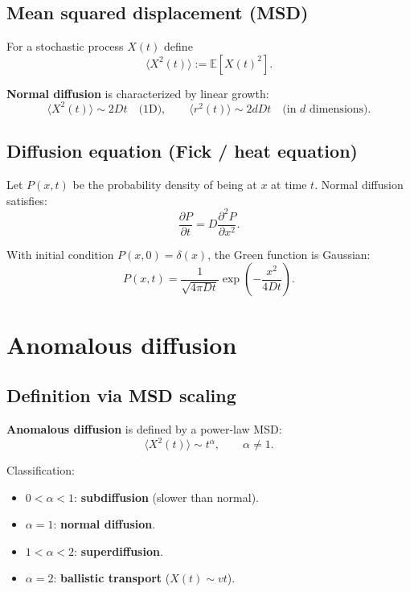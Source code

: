 \subsection{Mean squared displacement (MSD)}
For a stochastic process $X(t)$ define
\begin{equation}
\langle X^2(t)\rangle := \mathbb{E}[X(t)^2].
\end{equation}

\textbf{Normal diffusion} is characterized by linear growth:
\begin{equation}
\langle X^2(t)\rangle \sim 2Dt \quad \text{(1D)}, 
\qquad
\langle r^2(t)\rangle \sim 2dDt \quad \text{(in $d$ dimensions)}.
\end{equation}

\subsection{Diffusion equation (Fick / heat equation)}
Let $P(x,t)$ be the probability density of being at $x$ at time $t$.
Normal diffusion satisfies:
\begin{equation}
\frac{\partial P}{\partial t} = D\frac{\partial^2 P}{\partial x^2}.
\end{equation}

With initial condition $P(x,0)=\delta(x)$, the Green function is Gaussian:
\begin{equation}
P(x,t)=\frac{1}{\sqrt{4\pi Dt}}\exp\!\left(-\frac{x^2}{4Dt}\right).
\end{equation}


\section{Anomalous diffusion}

\subsection{Definition via MSD scaling}
\textbf{Anomalous diffusion} is defined by a power-law MSD:
\begin{equation}
\langle X^2(t)\rangle \sim t^\alpha,
\qquad \alpha\neq 1.
\end{equation}

Classification:
\begin{itemize}
\item $0<\alpha<1$: \textbf{subdiffusion} (slower than normal).
\item $\alpha=1$: \textbf{normal diffusion}.
\item $1<\alpha<2$: \textbf{superdiffusion}.
\item $\alpha=2$: \textbf{ballistic transport} ($X(t)\sim vt$).
\end{itemize}

